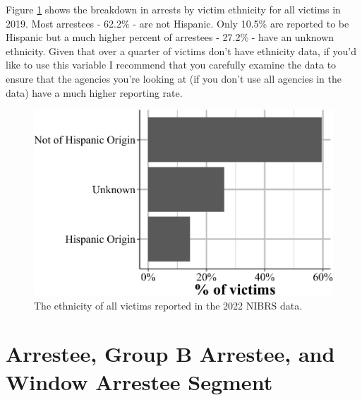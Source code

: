 \documentclass[
  12pt,
  openany]{book}
\begin{document}
Figure \ref{fig:victimEthnicity} shows the breakdown in arrests by victim ethnicity for all victims in 2019. Most arrestees - 62.2\% - are not Hispanic. Only 10.5\% are reported to be Hispanic but a much higher percent of arrestees - 27.2\% - have an unknown ethnicity. Given that over a quarter of victims don't have ethnicity data, if you'd like to use this variable I recommend that you carefully examine the data to ensure that the agencies you're looking at (if you don't use all agencies in the data) have a much higher reporting rate.

\begin{figure}

{\centering \includegraphics[width=0.9\linewidth]{15_nibrs_victim_files/figure-latex/victimEthnicity-1} 

}

\caption{The ethnicity of all victims reported in the 2022 NIBRS data.}\label{fig:victimEthnicity}
\end{figure}

\chapter{Arrestee, Group B Arrestee, and Window Arrestee Segment}\label{arrestee}
\end{document}
